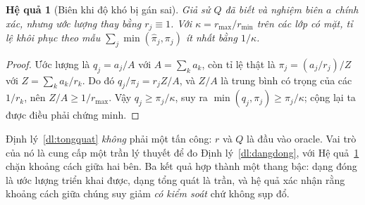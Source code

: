 \documentclass[11pt]{article}
\newtheorem{hequa}[dinhly]{Hệ quả}
\theoremstyle{remark}
\begin{document}
\begin{hequa}[Biên khi độ khó bị gán sai]
\label{hq:kappa}
Giả sử $Q$ đã biết và nghiệm biên $a$ chính xác, nhưng ước lượng thay bằng
$r_j \equiv 1$. Với $\kappa = r_{\max}/r_{\min}$ trên các lớp có mặt, tỉ lệ
khôi phục theo mẫu $\sum_j \min(\widehat\pi_j, \pi_j)$ ít nhất bằng
$1/\kappa$.
\end{hequa}

\begin{proof}
Ước lượng là $q_j = a_j/A$ với $A=\sum_k a_k$, còn tỉ lệ thật là
$\pi_j = (a_j/r_j)/Z$ với $Z = \sum_k a_k/r_k$. Do đó
$q_j/\pi_j = r_j Z/A$, và $Z/A$ là trung bình có trọng của các $1/r_k$, nên
$Z/A \ge 1/r_{\max}$. Vậy $q_j \ge \pi_j/\kappa$, suy ra
$\min(q_j,\pi_j) \ge \pi_j/\kappa$; cộng lại ta được điều phải chứng minh.
\end{proof}

Định lý~\ref{dl:tongquat} \emph{không} phải một tấn công: $r$ và $Q$ là đầu
vào oracle. Vai trò của nó là cung cấp một trần lý thuyết để đo
Định lý~\ref{dl:dangdong}, với Hệ quả~\ref{hq:kappa} chặn khoảng cách giữa
hai bên. Ba kết quả hợp thành một thang bậc: dạng đóng là ước lượng triển
khai được, dạng tổng quát là trần, và hệ quả xác nhận rằng khoảng cách giữa
chúng suy giảm \emph{có kiểm soát} chứ không sụp đổ.
\end{document}
